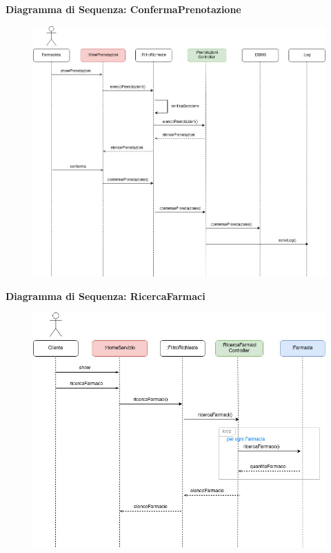\newpage

\textbf{Diagramma di Sequenza: ConfermaPrenotazione}
\begin{figure}[h!]
    \begin{center}
        \includegraphics[width=\textwidth]{immagini/Interazione-ConfermaPrenotazione-progettaz.jpg}
    \end{center}
\end{figure}

\newpage

\textbf{Diagramma di Sequenza: RicercaFarmaci}
\begin{figure}[h!]
    \begin{center}
        \includegraphics[width=\textwidth]{immagini/Interazione-RicercaFarmaco-progettaz.jpg}
    \end{center}
\end{figure}

